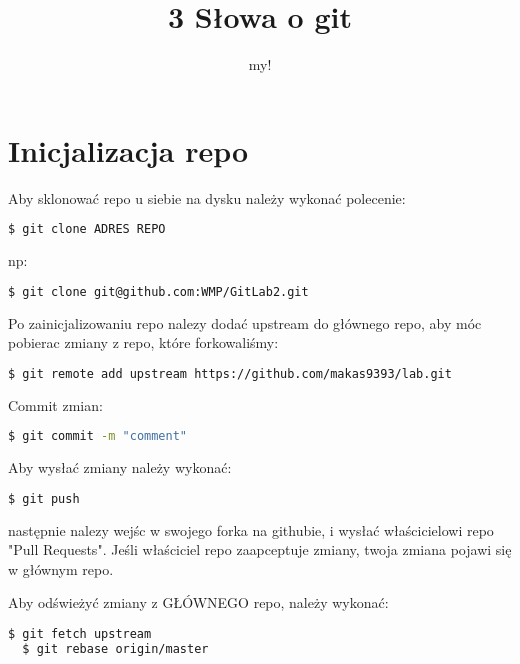 \documentclass[12pt,a4paper]{report}
\author{my!}
\title{3 Słowa o git}
\begin{document}
\maketitle

\chapter{Inicjalizacja repo}
Aby sklonować repo u siebie na dysku należy wykonać polecenie:
\begin{lstlisting}[language=bash]
  $ git clone ADRES REPO
\end{lstlisting}
np:
\begin{lstlisting}[language=bash]
  $ git clone git@github.com:WMP/GitLab2.git
\end{lstlisting}
Po zainicjalizowaniu repo nalezy dodać upstream do głównego repo, aby móc pobierac zmiany z repo, które forkowaliśmy:
\begin{lstlisting}[language=bash]
  $ git remote add upstream https://github.com/makas9393/lab.git
\end{lstlisting}

Commit zmian:
\begin{lstlisting}[language=bash]
  $ git commit -m "comment"
\end{lstlisting}

Aby wysłać zmiany należy wykonać:
\begin{lstlisting}[language=bash]
  $ git push
\end{lstlisting}
następnie nalezy wejśc w swojego forka na githubie, i wysłać właścicielowi repo "Pull Requests". Jeśli właściciel repo zaapceptuje zmiany, twoja zmiana pojawi się w głównym repo. 

Aby odświeżyć zmiany z GŁÓWNEGO repo, należy wykonać:
\begin{lstlisting}[language=bash]
  $ git fetch upstream
  $ git rebase origin/master
\end{lstlisting}
\end{document}
